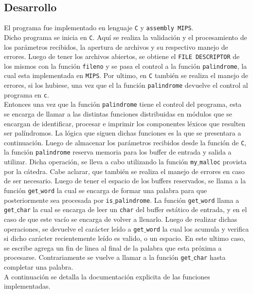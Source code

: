 \documentclass[a4paper, 10pt]{article}
\def\code#1{\texttt{#1}}
\begin{document}
		\subsection{Desarrollo}
			El programa fue implementado en lenguaje \code{C} y \code{assembly MIPS}.
			\\
			Dicho programa se inicia en \code{C}. Aquí se realiza la validación y el procesamiento de los parámetros recibidos, la apertura de archivos y su respectivo manejo de errores. Luego de tener los archivos abiertos, se obtiene el \code{FILE DESCRIPTOR} de los mismos con la función \code{fileno} y se pasa el control a la función \code{palindrome}, la cual esta implementada en \code{MIPS}. Por ultimo, en \code{C} también se realiza el manejo de errores, si los hubiese, una vez que el la función \code{palindrome} devuelve el control al programa en \code{c}.
			\\
			Entonces una vez que la función \code{palindrome} tiene el control del programa, esta se encarga de llamar a las distintas funciones distribuidas en módulos que se encargan de identificar, procesar e imprimir los componentes léxicos que resulten ser palíndromos.
			La lógica que siguen dichas funciones es la que se presentara a continuación. Luego de almacenar los parámetros recibidos desde la función de \code{C}, la función \code{palindrome} reserva memoria para los buffer de entrada y salida a utilizar. Dicha operación, se lleva a cabo utilizando la función \code{my$\_$malloc} provista por la cátedra. Cabe aclarar, que también se realiza el manejo de errores en caso de ser necesario. Luego de tener el espacio de los buffers reservados, se llama a la función \code{get$\_$word} la cual se encarga de formar una palabra para que posteriormente sea procesada por \code{is$\_$palindrome}. La función \code{get$\_$word} llama a \code{get$\_$char} la cual se encarga de leer un \code{char} del buffer estático de entrada, y en el caso de que este vacío se encarga de volver a llenarlo. Luego de realizar dichas operaciones, se devuelve el carácter leído a \code{get$\_$word} la cual los acumula y verifica si dicho carácter recientemente leído es valido, o un espacio. En este ultimo caso, se escribe agrega un fin de linea al final de la palabra que esta próxima a procesarse. Contrariamente se vuelve a llamar a la función \code{get$\_$char} hasta completar una palabra.
			\\
			A continuación se detalla la documentación explicita de las funciones implementadas.
		
\end{document}
